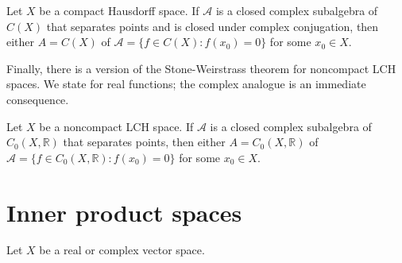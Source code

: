 \documentclass{article}
\theoremstyle{definition}
\numberwithin{equation}{section}
\newcommand{\R}{\mathbb{R}}
\begin{document}
		\begin{thm}
			Let $X$ be a compact Hausdorff space. If $\mathcal{A}$ is a closed complex subalgebra of $C(X)$ that separates points and is closed under complex conjugation, then either $A=C(X)$ of $\mathcal{A}=\{f\in C(X):f(x_0)=0\}$ for some $x_0\in X$.
		\end{thm}
		Finally, there is a version of the Stone-Weirstrass theorem for noncompact LCH spaces. We state for real functions; the complex analogue is an immediate consequence.
		\begin{thm}
			Let $X$ be a noncompact LCH space. If $\mathcal{A}$ is a closed complex subalgebra of $C_0(X,\R)$ that separates points, then either $A=C_0(X,\R)$ of $\mathcal{A}=\{f\in C_0(X,\R):f(x_0)=0\}$ for some $x_0\in X$.
		\end{thm}

\clearpage
\section{Inner product spaces}
	Let $X$ be a real or complex vector space.
\end{document}
